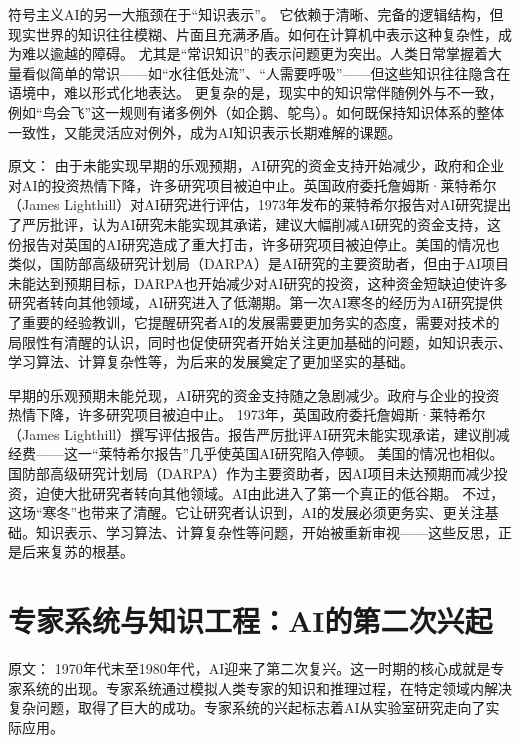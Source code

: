 符号主义AI的另一大瓶颈在于“知识表示”。  
它依赖于清晰、完备的逻辑结构，但现实世界的知识往往模糊、片面且充满矛盾。如何在计算机中表示这种复杂性，成为难以逾越的障碍。  
尤其是“常识知识”的表示问题更为突出。人类日常掌握着大量看似简单的常识——如“水往低处流”、“人需要呼吸”——但这些知识往往隐含在语境中，难以形式化地表达。  
更复杂的是，现实中的知识常伴随例外与不一致，例如“鸟会飞”这一规则有诸多例外（如企鹅、鸵鸟）。如何既保持知识体系的整体一致性，又能灵活应对例外，成为AI知识表示长期难解的课题。

原文：
由于未能实现早期的乐观预期，AI研究的资金支持开始减少，政府和企业对AI的投资热情下降，许多研究项目被迫中止。英国政府委托詹姆斯·莱特希尔（James Lighthill）对AI研究进行评估，1973年发布的莱特希尔报告对AI研究提出了严厉批评，认为AI研究未能实现其承诺，建议大幅削减AI研究的资金支持，这份报告对英国的AI研究造成了重大打击，许多研究项目被迫停止。美国的情况也类似，国防部高级研究计划局（DARPA）是AI研究的主要资助者，但由于AI项目未能达到预期目标，DARPA也开始减少对AI研究的投资，这种资金短缺迫使许多研究者转向其他领域，AI研究进入了低潮期。第一次AI寒冬的经历为AI研究提供了重要的经验教训，它提醒研究者AI的发展需要更加务实的态度，需要对技术的局限性有清醒的认识，同时也促使研究者开始关注更加基础的问题，如知识表示、学习算法、计算复杂性等，为后来的发展奠定了更加坚实的基础。

早期的乐观预期未能兑现，AI研究的资金支持随之急剧减少。政府与企业的投资热情下降，许多研究项目被迫中止。  
1973年，英国政府委托詹姆斯·莱特希尔（James Lighthill）撰写评估报告。报告严厉批评AI研究未能实现承诺，建议削减经费——这一“莱特希尔报告”几乎使英国AI研究陷入停顿。  
美国的情况也相似。国防部高级研究计划局（DARPA）作为主要资助者，因AI项目未达预期而减少投资，迫使大批研究者转向其他领域。AI由此进入了第一个真正的低谷期。  
不过，这场“寒冬”也带来了清醒。它让研究者认识到，AI的发展必须更务实、更关注基础。知识表示、学习算法、计算复杂性等问题，开始被重新审视——这些反思，正是后来复苏的根基。


\section{专家系统与知识工程：AI的第二次兴起}

原文：
1970年代末至1980年代，AI迎来了第二次复兴。这一时期的核心成就是专家系统的出现。专家系统通过模拟人类专家的知识和推理过程，在特定领域内解决复杂问题，取得了巨大的成功。专家系统的兴起标志着AI从实验室研究走向了实际应用。

